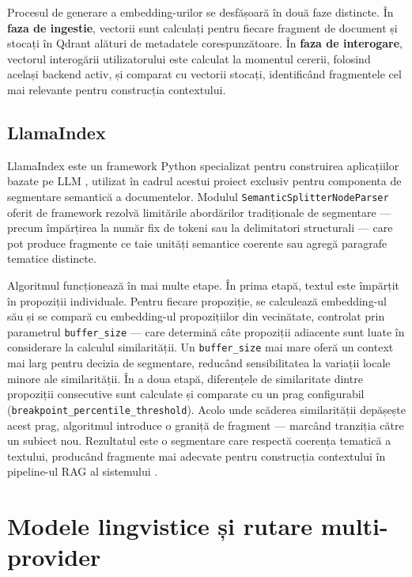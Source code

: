 \documentclass[12pt, a4paper, oneside, romanian]{teza-upb}
\begin{document}
Procesul de generare a embedding-urilor se desfășoară în două faze distincte. În \textbf{faza de ingestie}, vectorii sunt calculați pentru fiecare fragment de document și stocați în Qdrant alături de metadatele corespunzătoare. În \textbf{faza de interogare}, vectorul interogării utilizatorului este calculat la momentul cererii, folosind același backend activ, și comparat cu vectorii stocați, identificând fragmentele cel mai relevante pentru construcția contextului.

\subsection{LlamaIndex}

LlamaIndex este un framework Python specializat pentru construirea aplicațiilor 
bazate pe LLM \cite{llamaindex_doc}, utilizat în cadrul acestui proiect exclusiv 
pentru componenta de segmentare semantică a documentelor. Modulul 
\texttt{SemanticSplitterNodeParser} oferit de framework rezolvă limitările 
abordărilor tradiționale de segmentare — precum împărțirea la număr fix de 
tokeni sau la delimitatori structurali — care pot produce fragmente ce taie 
unități semantice coerente sau agregă paragrafe tematice distincte.

Algoritmul funcționează în mai multe etape. În prima etapă, textul este împărțit 
în propoziții individuale. Pentru fiecare propoziție, se calculează embedding-ul 
său și se compară cu embedding-ul propozițiilor din vecinătate, controlat prin 
parametrul \texttt{buffer\_size} — care determină câte propoziții adiacente sunt 
luate în considerare la calculul similarității. Un \texttt{buffer\_size} mai mare 
oferă un context mai larg pentru decizia de segmentare, reducând sensibilitatea 
la variații locale minore ale similarității. În a doua etapă, diferențele de 
similaritate dintre propoziții consecutive sunt calculate și comparate cu un prag configurabil (\texttt{breakpoint\_percentile\_threshold}). Acolo unde 
scăderea similarității depășește acest prag, algoritmul introduce o graniță de 
fragment — marcând tranziția către un subiect nou. Rezultatul este o segmentare 
care respectă coerența tematică a textului, producând fragmente mai adecvate 
pentru construcția contextului în pipeline-ul RAG al sistemului \cite{llamaindex_doc}.

\section{Modele lingvistice și rutare multi-provider}
\end{document}
